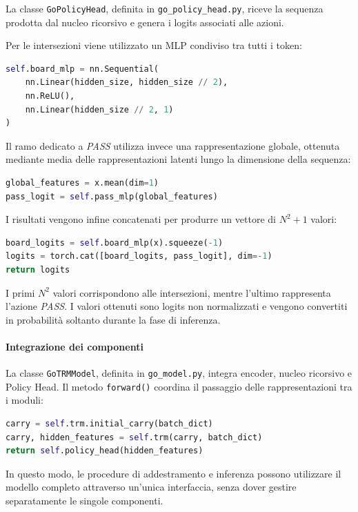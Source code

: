 La classe \texttt{GoPolicyHead}, definita in \texttt{go\_policy\_head.py}, riceve la sequenza prodotta dal nucleo ricorsivo e genera i logits associati alle azioni.

Per le intersezioni viene utilizzato un MLP condiviso tra tutti i token:

\begin{lstlisting}[language=Python, caption={MLP per la previsione delle mosse sul tabellone}, label={lst:policy_board}]
self.board_mlp = nn.Sequential(
    nn.Linear(hidden_size, hidden_size // 2),
    nn.ReLU(),
    nn.Linear(hidden_size // 2, 1)
)
\end{lstlisting}

Il ramo dedicato a \textit{PASS} utilizza invece una rappresentazione globale, ottenuta mediante media delle rappresentazioni latenti lungo la dimensione della sequenza:

\begin{lstlisting}[language=Python, caption={Generazione del logit PASS}, label={lst:policy_pass}]
global_features = x.mean(dim=1)
pass_logit = self.pass_mlp(global_features)
\end{lstlisting}

I risultati vengono infine concatenati per produrre un vettore di \(N^2+1\) valori:

\begin{lstlisting}[language=Python, caption={Composizione dell'output della Policy Head}, label={lst:policy_output}]
board_logits = self.board_mlp(x).squeeze(-1)
logits = torch.cat([board_logits, pass_logit], dim=-1)
return logits
\end{lstlisting}

I primi \(N^2\) valori corrispondono alle intersezioni, mentre l'ultimo rappresenta l'azione \textit{PASS}. I valori ottenuti sono logits non normalizzati e vengono convertiti in probabilità soltanto durante la fase di inferenza.

\paragraph{Integrazione dei componenti}

La classe \texttt{GoTRMModel}, definita in \texttt{go\_model.py}, integra encoder, nucleo ricorsivo e Policy Head. Il metodo \texttt{forward()} coordina il passaggio delle rappresentazioni tra i moduli:

\begin{lstlisting}[language=Python, caption={Integrazione tra nucleo ricorsivo e Policy Head}, label={lst:go_model}]
carry = self.trm.initial_carry(batch_dict)
carry, hidden_features = self.trm(carry, batch_dict)
return self.policy_head(hidden_features)
\end{lstlisting}

In questo modo, le procedure di addestramento e inferenza possono utilizzare il modello completo attraverso un'unica interfaccia, senza dover gestire separatamente le singole componenti.
